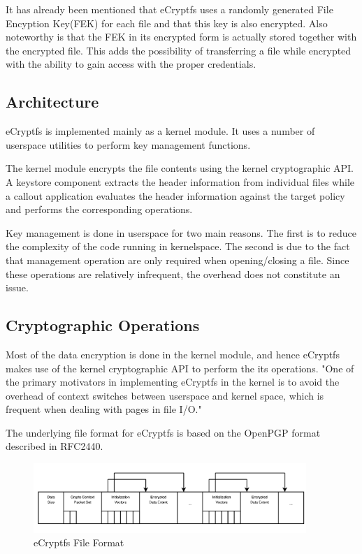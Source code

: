 It has already been mentioned that eCryptfs uses a randomly generated File Encyption Key(FEK) for each file and that this key is also encrypted. Also noteworthy is that the FEK in its encrypted form is actually stored together with the encrypted file. This adds the possibility of transferring a file while encrypted with the ability to gain access with the proper credentials.

\subsection{Architecture}
\label{sub-sec:arch-ecryptfs}

eCryptfs is implemented mainly as a kernel module. It uses a number of userspace utilities to perform key management functions.


The kernel module encrypts the file contents using the kernel cryptographic API. A keystore component extracts the header information from individual files while a callout application evaluates the header information against the target policy and performs the corresponding operations.

Key management is done in userspace for two main reasons. The first is to reduce the complexity of the code running in kernelspace. The second is due to the fact that management operation are only required when opening/closing a file. Since these operations are relatively infrequent, the overhead does not constitute an issue.

\subsection{Cryptographic Operations}
\label{sub-sec:crypt-ops-ecryptfs}

Most of the data encryption is done in the kernel module, and hence eCryptfs makes use of the kernel cryptographic API to perform the its operations. "One of the primary motivators in implementing eCryptfs in the kernel is to avoid the overhead of context switches between userspace and kernel space, which is frequent when dealing with pages in file I/O\cite{ecryptfs-paper}."

The underlying file format for eCryptfs is based on the OpenPGP format described in RFC2440\cite{rfc}.

\begin{figure}[h!]
\centering
    \includegraphics[width=0.92\textwidth]{src/img/ecryptfs/fileformat.png}
\caption{eCryptfs File Format\cite{ecryptfs-paper}}
\end{figure}

